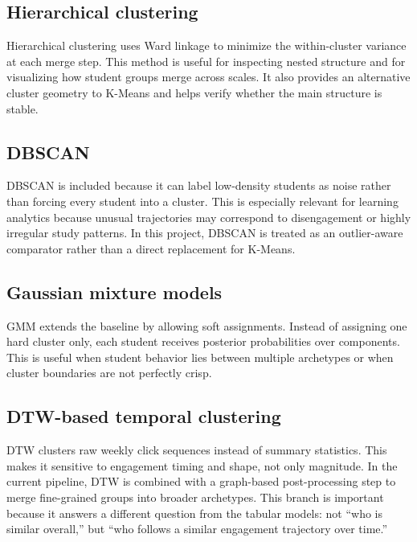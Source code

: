 \documentclass[11pt,a4paper]{article}
\begin{document}
\subsection{Hierarchical clustering}
Hierarchical clustering uses Ward linkage to minimize the within-cluster variance at each merge step. This method is useful for inspecting nested structure and for visualizing how student groups merge across scales. It also provides an alternative cluster geometry to K-Means and helps verify whether the main structure is stable.

\subsection{DBSCAN}
DBSCAN is included because it can label low-density students as noise rather than forcing every student into a cluster. This is especially relevant for learning analytics because unusual trajectories may correspond to disengagement or highly irregular study patterns. In this project, DBSCAN is treated as an outlier-aware comparator rather than a direct replacement for K-Means.

\subsection{Gaussian mixture models}
GMM extends the baseline by allowing soft assignments. Instead of assigning one hard cluster only, each student receives posterior probabilities over components. This is useful when student behavior lies between multiple archetypes or when cluster boundaries are not perfectly crisp.

\subsection{DTW-based temporal clustering}
DTW clusters raw weekly click sequences instead of summary statistics. This makes it sensitive to engagement timing and shape, not only magnitude. In the current pipeline, DTW is combined with a graph-based post-processing step to merge fine-grained groups into broader archetypes. This branch is important because it answers a different question from the tabular models: not ``who is similar overall,'' but ``who follows a similar engagement trajectory over time.''
\end{document}
